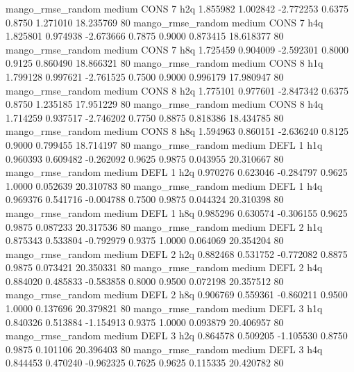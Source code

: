 mango_rmse_random     medium     CONS                 7                  h2q  1.855982 1.002842 -2.772253 0.6375 0.8750  1.271010   18.235769 80
mango_rmse_random     medium     CONS                 7                  h4q  1.825801 0.974938 -2.673666 0.7875 0.9000  0.873415   18.618377 80
mango_rmse_random     medium     CONS                 7                  h8q  1.725459 0.904009 -2.592301 0.8000 0.9125  0.860490   18.866321 80
mango_rmse_random     medium     CONS                 8                  h1q  1.799128 0.997621 -2.761525 0.7500 0.9000  0.996179   17.980947 80
mango_rmse_random     medium     CONS                 8                  h2q  1.775101 0.977601 -2.847342 0.6375 0.8750  1.235185   17.951229 80
mango_rmse_random     medium     CONS                 8                  h4q  1.714259 0.937517 -2.746202 0.7750 0.8875  0.818386   18.434785 80
mango_rmse_random     medium     CONS                 8                  h8q  1.594963 0.860151 -2.636240 0.8125 0.9000  0.799455   18.714197 80
mango_rmse_random     medium     DEFL                 1                  h1q  0.960393 0.609482 -0.262092 0.9625 0.9875  0.043955   20.310667 80
mango_rmse_random     medium     DEFL                 1                  h2q  0.970276 0.623046 -0.284797 0.9625 1.0000  0.052639   20.310783 80
mango_rmse_random     medium     DEFL                 1                  h4q  0.969376 0.541716 -0.004788 0.7500 0.9875  0.044324   20.310398 80
mango_rmse_random     medium     DEFL                 1                  h8q  0.985296 0.630574 -0.306155 0.9625 0.9875  0.087233   20.317536 80
mango_rmse_random     medium     DEFL                 2                  h1q  0.875343 0.533804 -0.792979 0.9375 1.0000  0.064069   20.354204 80
mango_rmse_random     medium     DEFL                 2                  h2q  0.882468 0.531752 -0.772082 0.8875 0.9875  0.073421   20.350331 80
mango_rmse_random     medium     DEFL                 2                  h4q  0.884020 0.485833 -0.583858 0.8000 0.9500  0.072198   20.357512 80
mango_rmse_random     medium     DEFL                 2                  h8q  0.906769 0.559361 -0.860211 0.9500 1.0000  0.137696   20.379821 80
mango_rmse_random     medium     DEFL                 3                  h1q  0.840326 0.513884 -1.154913 0.9375 1.0000  0.093879   20.406957 80
mango_rmse_random     medium     DEFL                 3                  h2q  0.864578 0.509205 -1.105530 0.8750 0.9875  0.101106   20.396403 80
mango_rmse_random     medium     DEFL                 3                  h4q  0.844453 0.470240 -0.962325 0.7625 0.9625  0.115335   20.420782 80

